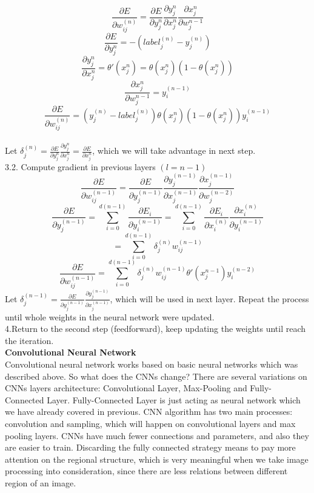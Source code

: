 \documentclass[11pt,letterpaper]{article}
\begin{document}
$$\frac{\partial E}{\partial w^{(n)}_{ij}} = \frac{\partial E}{\partial y^{n}_{j}} \frac{\partial y^{n}_{j}}{\partial x^{n}_{j}} \frac{\partial x^{n}_{j}}{\partial w^{n-1}_{j}}$$ 
$$\frac{\partial E}{\partial y^{n}_{j}} = -(label^{(n)}_{j}-y^{(n)}_{j})$$
$$\frac{\partial y^{n}_{j}}{\partial x^{n}_{j}} = \theta'(x^{n}_{j}) = \theta(x^{n}_{j})(1-\theta(x^{n}_{j}))$$
$$\frac{\partial x^{n}_{j}}{\partial w^{n-1}_{j}} = y^{(n-1)}_{i}$$
$$\frac{\partial E}{\partial w^{(n)}_{ij}} = (y^{(n)}_{j}-label^{(n)}_{j})\theta(x^{n}_{j})(1-\theta(x^{n}_{j}))y^{(n-1)}_{i}$$
\\Let $\delta^{(n)}_{j} = \frac{\partial E}{\partial y^{n}_{j}}\frac{\partial y^{n}_{j}}{\partial x^{n}_{j}}=\frac{\partial E}{\partial x^{n}_{j}}$, which we will take advantage in next step.\\
3.2. Compute gradient in previous layers $(l = n-1)$
$$\frac{\partial E}{\partial w^{(n-1)}_{ij}} = \frac{\partial E}{\partial y^{(n-1)}_{j}} \frac{\partial y^{(n-1)}_{j}}{\partial x^{(n-1)}_{j}} \frac{\partial x^{(n-1)}_{j}}{\partial w^{(n-2)}_{j}}$$
$$\frac{\partial E}{\partial y^{(n-1)}_{j}}=\sum^{d(n-1)}_{i=0}\frac{\partial E_{i}}{\partial y^{(n-1)}_{i}}=\sum^{d(n-1)}_{i=0}\frac{\partial E_{i}}{\partial x^{(n)}_{i}}\frac{\partial x^{(n)}_{i}}{\partial y^{(n-1)}_{i}} $$
$$= \sum^{d(n-1)}_{i=0} \delta^{(n)}_{j} w^{(n-1)}_{ij}$$
$$\frac{\partial E}{\partial w^{(n-1)}_{ij}} = \sum^{d(n-1)}_{i=0} \delta^{(n)}_{j} w^{(n-1)}_{ij} \theta'(x^{n-1}_{j})y^{(n-2)}_{i}$$
Let $\delta^{(n-1)}_{j} =\frac{\partial E}{\partial y^{(n-1)}_{j}} \frac{\partial y^{(n-1)}_{j}}{\partial x^{(n-1)}_{j}}$, which will be used in next layer. Repeat the process until whole weights in the neural network were updated.\\
4.Return to the second step (feedforward), keep updating the weights until reach the iteration.\\
{\bf Convolutional Neural Network}\\
Convolutional neural network works based on basic neural networks which was described above. So what does the CNNs change? There are several variations on CNNs layers architecture: Convolutional Layer, Max-Pooling and Fully-Connected Layer. Fully-Connected Layer is just acting as neural network which we have already covered in previous. CNN algorithm has two main processes: convolution and sampling, which will happen on convolutional layers and max pooling layers. CNNs have much fewer connections and parameters, and also they are easier to train. Discarding the fully connected strategy means to pay more attention on the regional structure, which is very meaningful when we take image processing into consideration, since there are less relations between different region of an image. \\
\end{document}
